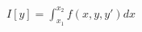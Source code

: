 \documentclass[preview]{standalone}
\begin{document}
\begin{align*}
I[y] = \int_{x_1}^{x_2} f(x, y, y') dx
\end{align*}
\end{document}
